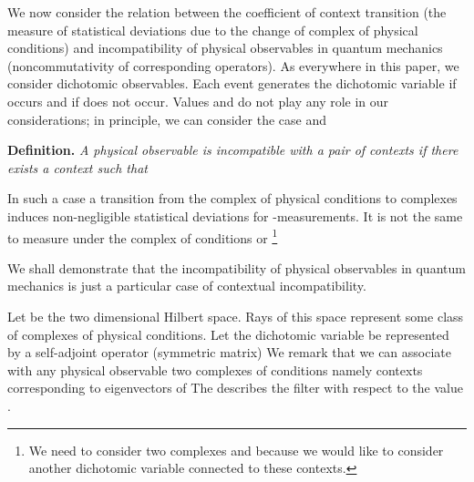 \documentclass[12pt,oneside,final,a4paper]{article}
\begin{document}
We now consider the relation between the coefficient of context transition
(the measure of statistical deviations due to the change of complex of physical conditions)
and incompatibility of physical observables in quantum mechanics (noncommutativity of
corresponding operators). As everywhere in this paper, we consider dichotomic observables.
Each event \coordHE{} generates the dichotomic variable \coordHE{}  \coordHE{} if \coordHE{} occurs and \coordHE{} if \coordHE{} does not
occur. Values \coordHE{} and \coordHE{} do not play any role in our considerations; in principle,
we can consider the case \coordHE{} and \coordHE{}

{\bf Definition.} {\it A physical observable \coordHE{} is incompatible with a pair \coordHE{} of contexts 
if there exists  a context \coordHE{}  such
that \coordHE{}}

In such a case a transition from the complex of physical conditions \coordHE{} to complexes
\coordHE{} induces non-negligible statistical deviations for \coordHE{}-measurements. It is not the same
to measure \coordHE{} under the complex of conditions \coordHE{} or \coordHE{}\footnote{
We need to consider two complexes \coordHE{} and \coordHE{} because we would like to 
consider another dichotomic variable \coordHE{} connected to these contexts.}

We shall demonstrate that the incompatibility of physical observables in quantum mechanics
is just a particular case of contextual incompatibility. 

Let \coordHE{} be the two dimensional Hilbert space. Rays of this space represent 
some class of complexes of physical conditions. 
Let the dichotomic variable \coordHE{} be represented  by a self-adjoint operator (symmetric
matrix) \coordHE{} We remark that we can associate with any physical observable \coordHE{} 
two complexes of conditions \coordHE{} 
namely contexts corresponding to eigenvectors \coordHE{} of  \coordHE{} 
The \coordHE{} describes the filter with respect to the value \coordHE{}.
\end{document}
